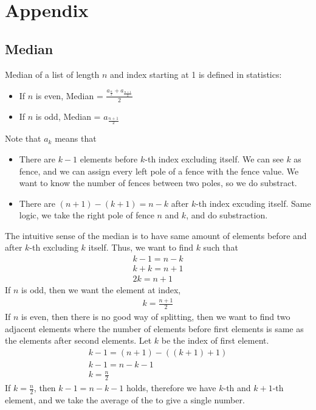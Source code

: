\documentclass{article}
\theoremstyle{plain}
\theoremstyle{definition}
\begin{document}
\section{Appendix}
\subsection{Median}
    Median of a list of length $n$ and index starting at 1 is defined in statistics:
    \begin{itemize}
        \item If $n$ is even, Median = $\frac{a_{\frac{n}{2}} + a_{\frac{n+1}{2}}}{2}$
        \item If $n$ is odd, Median = $a_{\frac{n+1}{2}}$
    \end{itemize}
    Note that $a_k$ means that
    \begin{itemize}
        \item There are $k-1$ elements before $k$-th index excluding itself. We can see $k$
            as fence, and we can assign every left pole of a fence with the fence value.
            We want to know the number of fences between two poles, so we do substract.
        \item There are $(n+1) - (k+1) = n-k$ after $k$-th index excuding itself.
            Same logic, we take the right pole of fence $n$ and $k$, and do substraction.
    \end{itemize}
    The intuitive sense of the median is to have same amount of elements before and after
    $k$-th excluding $k$ itself. Thus, we want to find $k$ such that
    \begin{gather*}
        k-1 = n-k\\
        k + k = n+1\\
        2k = n+1
    \end{gather*}
    If $n$ is odd, then we want the element at index,
    \begin{gather*}
        k = \frac{n+1}{2}
    \end{gather*}
    If $n$ is even, then there is no good way of splitting, then we want to find two
    adjacent elements where the number of elements before first elements is same
    as the elements after second elements. Let $k$ be the index of first element.
    \begin{gather*}
        k-1 = (n+1)-((k+1)+1)\\
        k-1 = n-k-1\\
        k = \frac{n}{2}
    \end{gather*}
    If $k = \frac{n}{2}$, then $k-1 = n-k-1$ holds, therefore we have $k$-th and $k+1$-th
    element, and we take the average of the to give a single number.
\end{document}
